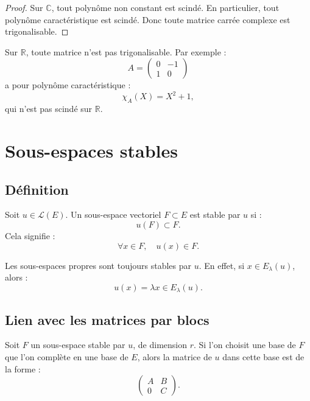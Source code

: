 \documentclass[11pt,a4paper]{article}
\newcommand{\R}{\mathbb R}
\newcommand{\C}{\mathbb C}
\newcommand{\Lcal}{\mathcal L}
\begin{document}
\begin{proof}
Sur \(\C\), tout polynôme non constant est scindé.  
En particulier, tout polynôme caractéristique est scindé.  
Donc toute matrice carrée complexe est trigonalisable.
\end{proof}

\begin{erreurbox}
Sur \(\R\), toute matrice n'est pas trigonalisable.  
Par exemple :
\[
A=
\begin{pmatrix}
0&-1\\
1&0
\end{pmatrix}
\]
a pour polynôme caractéristique :
\[
\chi_A(X)=X^2+1,
\]
qui n'est pas scindé sur \(\R\).
\end{erreurbox}

\section{Sous-espaces stables}

\subsection{Définition}

\begin{definitionbox}
Soit \(u\in\Lcal(E)\).  
Un sous-espace vectoriel \(F\subset E\) est stable par \(u\) si :
\[
u(F)\subset F.
\]
Cela signifie :
\[
\forall x\in F,\quad u(x)\in F.
\]
\end{definitionbox}

\begin{retenirbox}
Les sous-espaces propres sont toujours stables par \(u\).  
En effet, si \(x\in E_\lambda(u)\), alors :
\[
u(x)=\lambda x\in E_\lambda(u).
\]
\end{retenirbox}

\subsection{Lien avec les matrices par blocs}

\begin{theorembox}
Soit \(F\) un sous-espace stable par \(u\), de dimension \(r\).  
Si l'on choisit une base de \(F\) que l'on complète en une base de \(E\), alors la matrice de \(u\) dans cette base est de la forme :
\[
\begin{pmatrix}
A&B\\
0&C
\end{pmatrix}.
\]
\end{theorembox}
\end{document}
